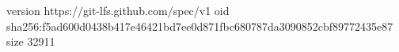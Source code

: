 version https://git-lfs.github.com/spec/v1
oid sha256:f5ad600d0438b417e46421bd7ee0d871fbc680787da3090852cbf89772435e87
size 32911
